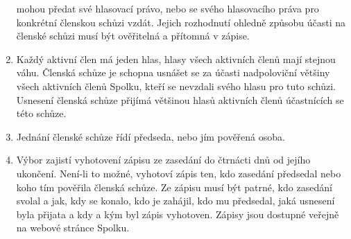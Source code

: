 \documentclass[11pt,a4paper]{article}
\begin{document}
\begin{enumerate}[itemsep=0pt]
    mohou předat své hlasovací právo, nebo se svého hlasovacího práva pro
    konkrétní členskou schůzi vzdát. Jejich rozhodnutí ohledně způsobu účasti
    na členské schůzi musí být ověřitelná a přítomná v zápise.
    \item Každý aktivní člen má jeden hlas, hlasy všech aktivních členů mají 
    stejnou váhu. Členská schůze je schopna usnášet se za účasti nadpoloviční 
    většiny všech aktivních členů Spolku, kteří se nevzdali svého hlasu pro tuto schůzi.
    Usnesení členská schůze přijímá většinou hlasů aktivních členů účastnících se této schůze. 
    \item Jednání členské schůze řídí předseda, nebo jím pověřená osoba.
    \item Výbor zajistí vyhotovení zápisu ze zasedání do čtrnácti dnů od jejího 
    ukončení. Není-li to možné, vyhotoví zápis ten, kdo zasedání předsedal nebo 
    koho tím pověřila členská schůze. Ze zápisu musí být patrné, kdo zasedání 
    svolal a jak, kdy se konalo, kdo je zahájil, kdo mu předsedal, jaká usnesení
    byla přijata a kdy a kým byl zápis vyhotoven. Zápisy jsou dostupné veřejně 
    na webové stránce Spolku.
\end{enumerate}
\end{document}
